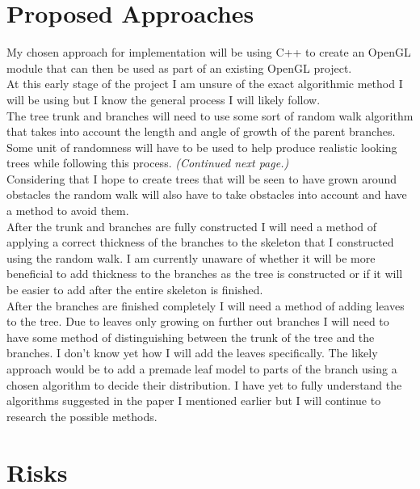 \documentclass[proposal]{cmpreport}
\begin{document}
\section{Proposed Approaches}
My chosen approach for implementation will be using C++ to create an OpenGL module 
that can then be used as part of an existing OpenGL project. \\
At this early stage of the project I am unsure of the exact algorithmic method I 
will be using but I know the general process I will likely follow. \\
The tree trunk and branches will need to use some sort of random walk algorithm that 
takes into account the length and angle of growth of the parent branches. Some unit 
of randomness will have to be used to help produce realistic looking trees while 
following this process. \textit{(Continued next page.)}
\\
Considering that I hope to create trees that will be seen to have grown 
around obstacles the random walk will also have to take obstacles into account and 
have a method to avoid them. \\
After the trunk and branches are fully constructed I will need a method of applying 
a correct thickness of the branches to the skeleton that I constructed using the 
random walk. I am currently unaware of whether it will be more beneficial to add 
thickness to the branches as the tree is constructed or if it will be easier to add 
after the entire skeleton is finished. \\
After the branches are finished completely I will need a method of adding leaves to 
the tree. Due to leaves only growing on further out branches I will need to have 
some method of distinguishing between the trunk of the tree and the branches. I don't 
know yet how I will add the leaves specifically. The likely approach would be to add 
a premade leaf model to parts of the branch using a chosen algorithm to decide their 
distribution. I have yet to fully understand the algorithms suggested in the paper I 
mentioned earlier \cite{colonization} but I will continue to research the possible 
methods.


\section{Risks}
\end{document}
